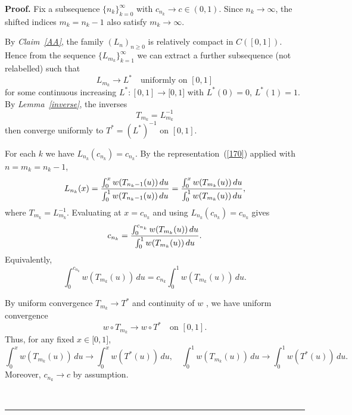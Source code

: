 \documentclass[onecolumn]{article}
\newenvironment{proof}[1][Proof]{\noindent\textbf{#1.} }{\ \rule{0.5em}{0.5em}}
\begin{document}
\begin{proof}
\noindent Fix a subsequence $\{n_{k}\}_{k=0}^{\infty }$ with $%
c_{n_{k}}\rightarrow c\in (0,1)$. Since $n_{k}\rightarrow \infty $, the
shifted indices $m_{k}=n_{k}-1$ also satisfy $m_{k}\rightarrow \infty $.

By \textit{Claim~\ref{AA}}, the family $(L_{n})_{n\geq 0}$ is relatively
compact in $C([0,1])$. Hence from the sequence $\{L_{m_{k}}\}_{k=1}^{\infty
} $ we can extract a further subsequence (not relabelled) such that 
\begin{equation}
L_{m_{k}}\rightarrow L^{\ast }\quad \text{uniformly on }[0,1]  \label{510}
\end{equation}%
for some continuous increasing $L^{\ast }:[0,1]\rightarrow \lbrack 0,1]$
with $L^{\ast }(0)=0$, $L^{\ast }(1)=1$. By \textit{Lemma~\ref{inverse}},
the inverses 
\begin{equation}
T_{m_{k}}=L_{m_{k}}^{-1}  \label{511}
\end{equation}%
then converge uniformly to $T^{\ast }=(L^{\ast })^{-1}$ on $[0,1]$.

For each $k$ we have $L_{n_{k}}(c_{n_{k}})=c_{n_{k}}$. By the
representation~(\ref{170}) applied with $n=m_{k}=n_{k}-1$, 
\begin{equation}
L_{n_{k}}(x)=\frac{\int_{0}^{x}w(T_{n_{k}-1}(u))\,du}{%
\int_{0}^{1}w(T_{n_{k}-1}(u))\,du}=\frac{\int_{0}^{x}w(T_{m_{k}}(u))\,du}{%
\int_{0}^{1}w(T_{m_{k}}(u))\,du},  \label{512}
\end{equation}%
where $T_{m_{k}}=L_{m_{k}}^{-1}$. Evaluating at $x=c_{n_{k}}$ and using $%
L_{n_{k}}(c_{n_{k}})=c_{n_{k}}$ gives 
\begin{equation}
c_{n_{k}}=\frac{\int_{0}^{c_{n_{k}}}w(T_{m_{k}}(u))\,du}{%
\int_{0}^{1}w(T_{m_{k}}(u))\,du}.  \label{513}
\end{equation}%
Equivalently, 
\begin{equation}
\int_{0}^{c_{n_{k}}}w(T_{m_{k}}(u))\,du=c_{n_{k}}\int_{0}^{1}w(T_{m_{k}}(u))%
\,du.  \label{514}
\end{equation}

By uniform convergence $T_{m_{k}}\rightarrow T^{\ast }$ and continuity of $w$%
, we have uniform convergence 
\begin{equation*}
w\circ T_{m_{k}}\rightarrow w\circ T^{\ast }\quad \text{on }[0,1].
\end{equation*}%
Thus, for any fixed $x\in \lbrack 0,1]$, 
\begin{equation}
\int_{0}^{x}w(T_{m_{k}}(u))\,du\longrightarrow \int_{0}^{x}w(T^{\ast
}(u))\,du,\quad \int_{0}^{1}w(T_{m_{k}}(u))\,du\longrightarrow
\int_{0}^{1}w(T^{\ast }(u))\,du.  \label{515}
\end{equation}%
Moreover, $c_{n_{k}}\rightarrow c$ by assumption.


\end{proof}
\end{document}
